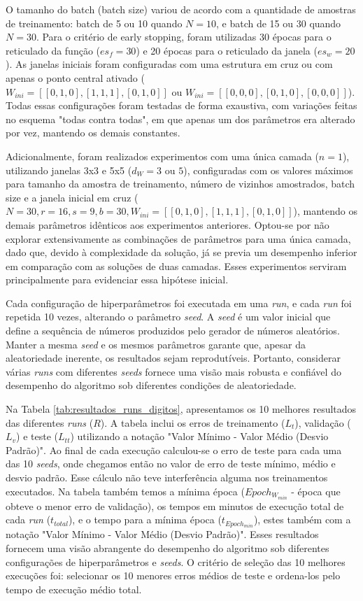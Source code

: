 O tamanho do batch (batch size) variou de acordo com a quantidade de amostras de treinamento: batch de 5 ou 10 quando $N = 10$, e batch de 15 ou 30 quando $N = 30$. Para o critério de early stopping, foram utilizadas 30 épocas para o reticulado da função ($es_{f} = 30$) e 20 épocas para o reticulado da janela ($es_{w} = 20$). As janelas iniciais foram configuradas com uma estrutura em cruz ou com apenas o ponto central ativado ($W_{ini} = [[0,1,0],[1,1,1],[0,1,0]] \text{ ou } W_{ini} = [[0,0,0],[0,1,0],[0,0,0]]$). Todas essas configurações foram testadas de forma exaustiva, com variações feitas no esquema "todas contra todas", em que apenas um dos parâmetros era alterado por vez, mantendo os demais constantes.

Adicionalmente, foram realizados experimentos com uma única camada ($n = 1$), utilizando janelas 3x3 e 5x5 ($d_{W} = 3 \text{ ou } 5$), configuradas com os valores máximos para tamanho da amostra de treinamento, número de vizinhos amostrados, batch size e a janela inicial em cruz ($N = 30, r = 16, s = 9, b = 30, W_{ini} = [[0,1,0],[1,1,1],[0,1,0]]$), mantendo os demais parâmetros idênticos aos experimentos anteriores. Optou-se por não explorar extensivamente as combinações de parâmetros para uma única camada, dado que, devido à complexidade da solução, já se previa um desempenho inferior em comparação com as soluções de duas camadas. Esses experimentos serviram principalmente para evidenciar essa hipótese inicial.

Cada configuração de hiperparâmetros foi executada em uma \textit{run}, e cada \textit{run} foi repetida 10 vezes, alterando o parâmetro \textit{seed}. A \textit{seed} é um valor inicial que define a sequência de números produzidos pelo gerador de números aleatórios. Manter a mesma \textit{seed} e os mesmos parâmetros garante que, apesar da aleatoriedade inerente, os resultados sejam reprodutíveis. Portanto, considerar várias \textit{runs} com diferentes \textit{seeds} fornece uma visão mais robusta e confiável do desempenho do algoritmo sob diferentes condições de aleatoriedade.

Na Tabela \ref{tab:resultados_runs_digitos}, apresentamos os 10 melhores resultados das diferentes \textit{runs} ($R$). A tabela inclui os erros de treinamento ($L_{t}$), validação ($L_{v}$) e teste ($L_{tt}$) utilizando a notação "Valor Mínimo - Valor Médio (Desvio Padrão)". Ao final de cada execução calculou-se o erro de teste para cada uma das 10 \textit{seeds}, onde chegamos então no valor de erro de teste mínimo, médio e desvio padrão. Esse cálculo não teve interferência alguma nos treinamentos executados. Na tabela também temos a mínima época ($Epoch_{W_{min}}$ - época que obteve o menor erro de validação), os tempos em minutos de execução total de cada \textit{run} ($t_{total}$),  e o tempo para a mínima época ($t_{Epoch_{min}}$), estes também com a notação "Valor Mínimo - Valor Médio (Desvio Padrão)". Esses resultados fornecem uma visão abrangente do desempenho do algoritmo sob diferentes configurações de hiperparâmetros e \textit{seeds}. O critério de seleção das 10 melhores execuções foi: selecionar os 10 menores erros médios de teste e ordena-los pelo tempo de execução médio total. 

